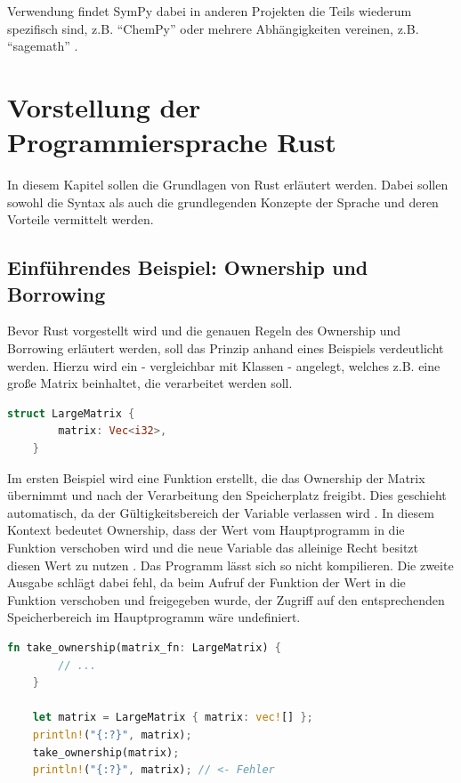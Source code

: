 \documentclass[11pt,a4paper, ngerman]{article}
\begin{document}
Verwendung findet SymPy dabei in anderen Projekten die Teils wiederum spezifisch sind, z.B. ``ChemPy'' \cite{ChemPy} oder mehrere Abhängigkeiten vereinen, z.B. ``sagemath'' \cite {Sagemath}.

\newpage

\section{Vorstellung der Programmiersprache Rust}
In diesem Kapitel sollen die Grundlagen von Rust erläutert werden. Dabei sollen sowohl die Syntax als auch die grundlegenden Konzepte der Sprache und deren Vorteile vermittelt werden.

\subsection{Einführendes Beispiel: Ownership und Borrowing}
Bevor Rust vorgestellt wird und die genauen Regeln des Ownership und Borrowing erläutert werden, soll das Prinzip anhand eines Beispiels verdeutlicht werden. Hierzu wird ein  - vergleichbar mit Klassen - angelegt, welches z.B. eine große Matrix beinhaltet, die verarbeitet werden soll.

\begin{lstlisting}[language=rust, caption={Einführendes Beispiel: struct}]
    struct LargeMatrix {
        matrix: Vec<i32>,
    }
\end{lstlisting}

 Im ersten Beispiel wird eine Funktion erstellt, die das Ownership der Matrix übernimmt und nach der Verarbeitung den Speicherplatz freigibt. Dies geschieht automatisch, da der Gültigkeitsbereich der Variable  verlassen wird \cite{RustOwnershipFreed}. In diesem Kontext bedeutet Ownership, dass der Wert vom Hauptprogramm in die Funktion verschoben wird und die neue Variable  das alleinige Recht besitzt diesen Wert zu nutzen \cite{RustMovingTerm}. Das Programm lässt sich so nicht kompilieren. Die zweite Ausgabe schlägt dabei fehl, da beim Aufruf der Funktion der Wert in die Funktion verschoben und freigegeben wurde, der Zugriff auf den entsprechenden Speicherbereich im Hauptprogramm wäre undefiniert.

 \begin{lstlisting}[language=rust, caption={Einführendes Beispiel: Ownership abgeben}]
    fn take_ownership(matrix_fn: LargeMatrix) {
        // ...
    }

    let matrix = LargeMatrix { matrix: vec![] };
    println!("{:?}", matrix);
    take_ownership(matrix);
    println!("{:?}", matrix); // <- Fehler
\end{lstlisting}
\end{document}

